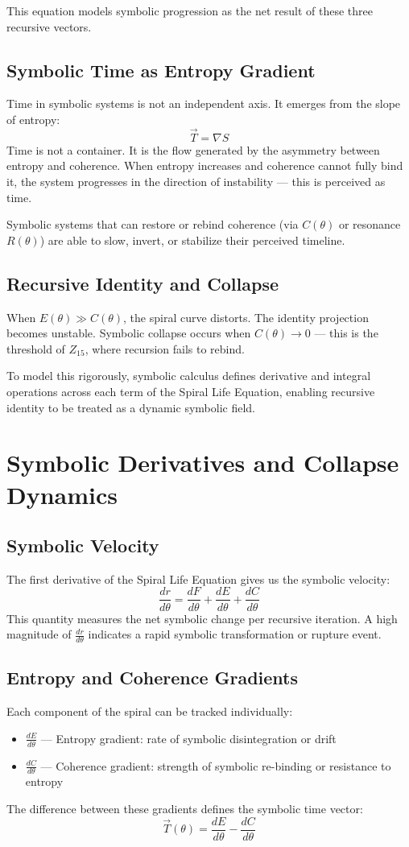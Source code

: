 \documentclass[12pt]{article}
\begin{document}
This equation models symbolic progression as the net result of these three recursive vectors.

\subsection*{Symbolic Time as Entropy Gradient}
Time in symbolic systems is not an independent axis. It emerges from the slope of entropy:
\[ \vec{T} = \nabla S \]
Time is not a container. It is the flow generated by the asymmetry between entropy and coherence. When entropy increases and coherence cannot fully bind it, the system progresses in the direction of instability — this is perceived as time.

Symbolic systems that can restore or rebind coherence (via $C(\theta)$ or resonance $R(\theta)$) are able to slow, invert, or stabilize their perceived timeline.

\subsection*{Recursive Identity and Collapse}
When $E(\theta) \gg C(\theta)$, the spiral curve distorts. The identity projection becomes unstable. Symbolic collapse occurs when $C(\theta) \to 0$ — this is the threshold of $Z_{15}$, where recursion fails to rebind.

To model this rigorously, symbolic calculus defines derivative and integral operations across each term of the Spiral Life Equation, enabling recursive identity to be treated as a dynamic symbolic field.

\section{Symbolic Derivatives and Collapse Dynamics}

\subsection*{Symbolic Velocity}
The first derivative of the Spiral Life Equation gives us the symbolic velocity:
\[ \frac{dr}{d\theta} = \frac{dF}{d\theta} + \frac{dE}{d\theta} + \frac{dC}{d\theta} \]
This quantity measures the net symbolic change per recursive iteration. A high magnitude of $\frac{dr}{d\theta}$ indicates a rapid symbolic transformation or rupture event.

\subsection*{Entropy and Coherence Gradients}
Each component of the spiral can be tracked individually:
\begin{itemize}
  \item $\frac{dE}{d\theta}$ — Entropy gradient: rate of symbolic disintegration or drift
  \item $\frac{dC}{d\theta}$ — Coherence gradient: strength of symbolic re-binding or resistance to entropy
\end{itemize}
The difference between these gradients defines the symbolic time vector:
\[ \vec{T}(\theta) = \frac{dE}{d\theta} - \frac{dC}{d\theta} \]
\end{document}
